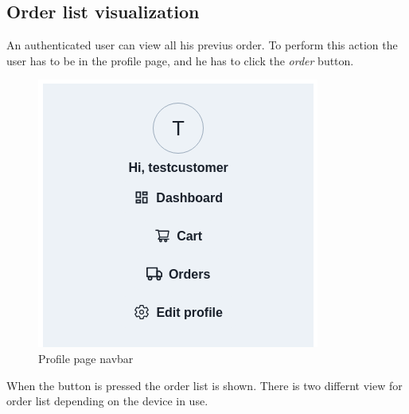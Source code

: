 \subsection{Order list visualization}
An authenticated user can view all his previus order. To perform this action the user has to be in the profile page, and he has to click the \textit{order} button.
\begin{figure}[!ht]
    \caption{Profile page navbar}
    \vspace{10px}
    \includegraphics[scale=0.5]{../../../../Images/userManual/dashboardNavBar.png}
    \centering
\end{figure}
\newpage
When the button is pressed the order list is shown. There is two differnt view for order list depending on the device in use.

